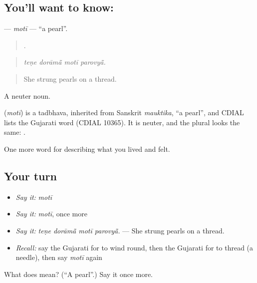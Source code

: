 \subsection*{You'll want to know: }
\textbf{} — \emph{motī} — \textquotedblleft{}a pearl\textquotedblright{}.

\begin{quote}
   .
\end{quote}

\begin{quote}
\emph{teṇe dorāmā̃ motī parovyā̃.}
\end{quote}

\begin{quote}
She strung pearls on a thread.
\end{quote}

A neuter noun.

\begin{cousinweb}
\textbf{} (\emph{motī}) is a tadbhava, inherited from Sanskrit \emph{mauktika}, \textquotedblleft{}a pearl\textquotedblright{}, and CDIAL lists the Gujarati word (CDIAL 10365). It is neuter, and the plural looks the same: \textbf{ }.
\end{cousinweb}

\begin{grammarlens}[title={What you've built}]
One more word for describing what you lived and felt.
\end{grammarlens}

\subsection*{Your turn}
\begin{itemize}
\raggedright
  \item \emph{Say it:} \emph{motī}
  \item \emph{Say it:} \emph{motī}, once more
  \item \emph{Say it:} \emph{teṇe dorāmā̃ motī parovyā̃.} — She strung pearls on a thread.
  \item \emph{Recall:} say the Gujarati for to wind round, then the Gujarati for to thread (a needle), then say \emph{motī} again
\end{itemize}

\begin{tcolorbox}[breakable,colback=teal!4,colframe=teal!35!black,title={Before you move on}]
What does  mean? (\textquotedblleft{}A pearl\textquotedblright{}.) Say it once more.
\end{tcolorbox}
